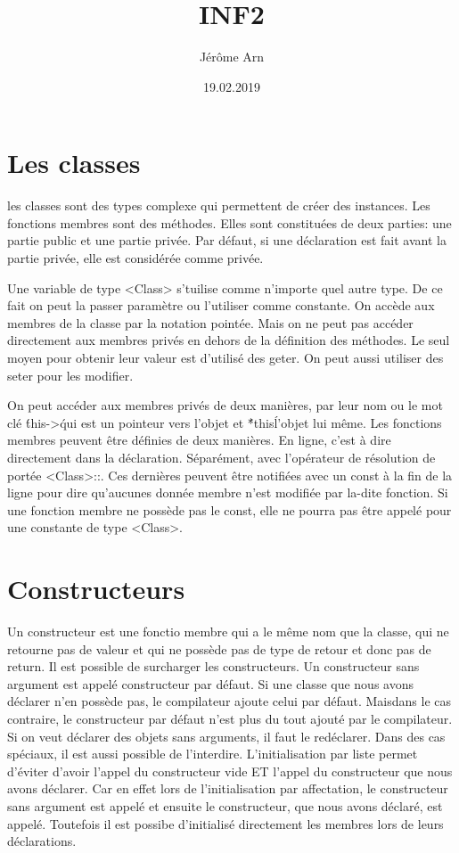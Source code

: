 \documentclass{article}
\title{INF2}
\author{Jérôme Arn}
\date{19.02.2019}
\begin{document}
\maketitle
\newpage

\tableofcontents
\newpage
\section{Les classes}
les classes sont des types complexe qui permettent de créer des instances. Les fonctions membres sont des méthodes. Elles sont constituées de deux parties: une partie public et une partie privée. Par défaut, si une déclaration est fait avant la partie privée, elle est considérée comme privée.

Une variable de type <Class> s'tuilise comme n'importe quel autre type. De ce fait on peut la passer paramètre ou l'utiliser comme constante. On accède aux membres de la classe par la notation pointée. Mais on ne peut pas accéder directement aux membres privés en dehors de la définition des méthodes. Le seul moyen pour obtenir leur valeur est d'utilisé des geter. On peut aussi utiliser des seter pour les modifier.

On peut accéder aux membres privés de deux manières, par leur nom ou le mot clé \'this->\' qui est un pointeur vers l'objet et \'*this\' l'objet lui même. Les fonctions membres peuvent être définies de deux manières. En ligne, c'est à dire directement dans la déclaration. Séparément, avec l'opérateur de résolution de portée <Class>::. Ces dernières peuvent être notifiées avec un const à la fin de la ligne pour dire qu'aucunes donnée membre n'est modifiée par la-dite fonction. Si une fonction membre ne possède pas le const, elle ne pourra pas être appelé pour une constante de type <Class>.  
\section{Constructeurs}
Un constructeur est une fonctio membre qui a le même nom que la classe, qui ne retourne pas de valeur et qui ne possède pas de type de retour et donc pas de return. Il est possible de surcharger les constructeurs. Un constructeur sans argument est appelé constructeur par défaut. Si une classe que nous avons déclarer n'en possède pas, le compilateur ajoute celui par défaut. Maisdans le cas contraire, le constructeur par défaut n'est plus du tout ajouté par le compilateur. Si on veut déclarer des objets sans arguments, il faut le redéclarer. Dans des cas spéciaux, il est aussi possible de l'interdire. L'initialisation par liste permet d'éviter d'avoir l'appel du constructeur vide ET l'appel du constructeur que nous avons déclarer. Car en effet lors de l'initialisation par affectation, le constructeur sans argument est appelé et ensuite le constructeur, que nous avons déclaré, est appelé.
Toutefois il est possibe d'initialisé directement les membres lors de leurs déclarations. 
\end{document}
